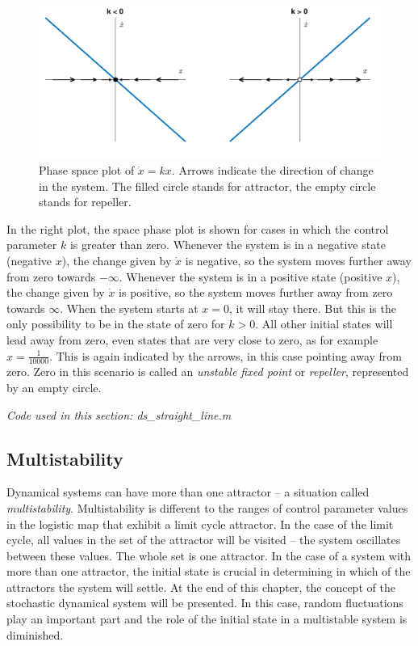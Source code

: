 \begin{figure}
\includegraphics[width=\textwidth]{figures/ch3/straight_line.pdf}
\caption[Phase space plot of $\dot{x} = kx$.]{Phase space plot of $\dot{x} = kx$. Arrows indicate the direction of change in the system. The filled circle stands for attractor, the empty circle stands for repeller.}
\label{fig:phase_space_straight_line}
\end{figure}

In the right plot, the space phase plot is shown for cases in which the control parameter $k$ is greater than zero. Whenever the system is in a negative state (negative $x$), the change given by $\dot{x}$ is negative, so the system moves further away from zero towards $-\infty$. Whenever the system is in a positive state \largerpage(positive $x$), the change given by $\dot{x}$ is positive, so the system moves further away from zero towards $\infty$. When the system starts at $x = 0$, it will stay there. But this is the only possibility to be in the state of zero for $k > 0$. All other initial states will lead away from zero, even states that are very close to zero, as for example $x = \frac{1}{10000}$. This is again indicated by the arrows, in this case pointing away from zero. Zero in this scenario is called an \emph{unstable fixed point} or \emph{repeller}, represented by an empty circle.

\medskip\noindent \textit{Code used in this section: ds\_straight\_line.m}

\subsection{Multistability}

Dynamical systems can have more than one attractor -- a situation called \emph{multistability}. Multistability is different to the ranges of control parameter values in the logistic map that exhibit a limit cycle attractor. In the case of the limit cycle, all values in the set of the attractor will be visited – the system oscillates between these values. The whole set is one attractor. In the case of a system with more than one attractor, the initial state is crucial in determining in which of the attractors the system will settle. At the end of this chapter, the concept of the stochastic dynamical system will be presented. In this case, random fluctuations play an important part and the role of the initial state in a multistable system is diminished.

